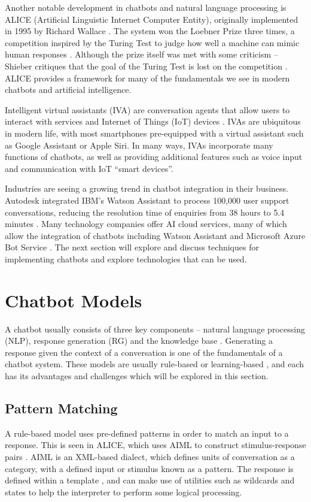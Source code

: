 Another notable development in chatbots and natural language processing is ALICE (Artificial Linguistic Internet Computer Entity), originally implemented in 1995 by Richard Wallace \cite{wallace2009anatomy}. The system won the Loebner Prize three times, a competition inspired by the Turing Test to judge how well a machine can mimic human responses \cite{keedwell2014loebner}. Although the prize itself was met with some criticism -- Shieber critiques that the goal of the Turing Test is lost on the competition \cite{shieber1994lessons}. ALICE provides a framework for many of the fundamentals we see in modern chatbots and artificial intelligence.

Intelligent virtual assistants (IVA) are conversation agents that allow users to interact with services and Internet of Things (IoT) devices \cite{chung2018intelligent}. IVAs are ubiquitous in modern life, with most smartphones pre-equipped with a virtual assistant such as Google Assistant or Apple Siri. In many ways, IVAs incorporate many functions of chatbots, as well as providing additional features such as voice input and communication with IoT “smart devices”.

Industries are seeing a growing trend in chatbot integration in their business. Autodesk integrated IBM’s Watson Assistant \cite{ibm2017watson} to process 100,000 user support conversations, reducing the resolution time of enquiries from 38 hours to 5.4 minutes \cite{ibm2017autodesk}. Many technology companies offer AI cloud services, many of which allow the integration of chatbots including Watson Assistant and Microsoft Azure Bot Service \cite{microsoft2019azure}. The next section will explore and discuss techniques for implementing chatbots and explore technologies that can be used.

\newpage
\section{Chatbot Models}
A chatbot usually consists of three key components – natural language processing (NLP), response generation (RG) and the knowledge base \cite{cahn2017chatbot}. Generating a response given the context of a conversation is one of the fundamentals of a chatbot system. These models are usually rule-based or learning-based \cite{wang2013dataset}, and each has its advantages and challenges which will be explored in this section.

\subsection{Pattern Matching}
A rule-based model uses pre-defined patterns in order to match an input to a response. This is seen in ALICE, which uses AIML to construct stimulus-response pairs \cite{wallace2009anatomy}. AIML is an XML-based dialect, which defines units of conversation as a category, with a defined input or stimulus known as a pattern. The response is defined within a template \cite{wallace2009anatomy}, and can make use of utilities such as wildcards and states to help the interpreter to perform some logical processing.

